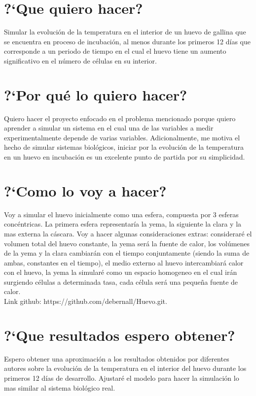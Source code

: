 \documentclass{article}
\begin{document}
\section{?`Que quiero hacer?}
Simular la evolución de la temperatura en el interior de un huevo de gallina que se encuentra en proceso de incubaci\'on, al menos durante los primeros 12 d\'ias que corresponde a un periodo de tiempo en el cual el huevo tiene un aumento significativo en el n\'umero de c\'elulas en su interior.

\section{?`Por qu\'e lo quiero hacer?}
Quiero hacer el proyecto enfocado en el problema mencionado porque quiero aprender a simular un sistema en el cual una de las variables a medir experimentalmente depende de varias variables. Adicionalmente, me motiva el hecho de simular sistemas biol\'ogicos, iniciar por la evolución de la temperatura en un huevo en incubación es un excelente punto de partida por su simplicidad.

\section{?`Como lo voy a hacer?}
Voy a simular el huevo inicialmente como una esfera, compuesta por 3 esferas conc\'entricas. La primera esfera representaría la yema, la siguiente la clara y la mas externa la c\'ascara. Voy a hacer algunas consideraciones extras: considerar\'e el volumen total del huevo constante, la yema será la fuente de calor, los vol\'umenes de la yema y la clara cambiarán con el tiempo conjuntamente (siendo la suma de ambas, constantes en el tiempo), el medio externo al huevo intercambiará calor con el huevo, la yema la simular\'e como un espacio homogeneo en el cual ir\'an surgiendo c\'elulas a determinada tasa, cada c\'elula ser\'a una pequeña fuente de calor. \\

Link github: https://github.com/debernall/Huevo.git.

\section{?`Que resultados espero obtener?}
Espero obtener una aproximaci\'on a los resultados obtenidos por diferentes autores sobre la evolución de la temperatura en el interior del huevo durante los primeros 12 d\'ias de desarrollo. Ajustar\'e el modelo para hacer la simulaci\'on lo mas similar al sistema biológico real.
\end{document}
